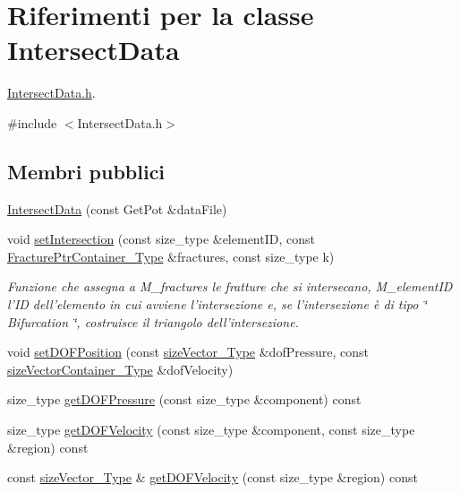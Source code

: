 \hypertarget{classIntersectData}{\section{Riferimenti per la classe Intersect\-Data}
\label{classIntersectData}
}


\hyperlink{IntersectData_8h}{Intersect\-Data.\-h}.  




{\ttfamily \#include $<$Intersect\-Data.\-h$>$}

\subsection*{Membri pubblici}
\begin{DoxyCompactItemize}
\item 
\hyperlink{classIntersectData_a6f368be5c978f120623bdef4b6acab12}{Intersect\-Data} (const Get\-Pot \&data\-File)
\item 
void \hyperlink{classIntersectData_a51a3df0f499c8150c32fe1f12f44ff8d}{set\-Intersection} (const size\-\_\-type \&element\-I\-D, const \hyperlink{FractureHandler_8h_a2f0b57e18ecf89912d7de0c87158009e}{Fracture\-Ptr\-Container\-\_\-\-Type} \&fractures, const size\-\_\-type k)
\begin{DoxyCompactList}\small\item\em Funzione che assegna a M\-\_\-fractures le fratture che si intersecano, M\-\_\-element\-I\-D l'I\-D dell'elemento in cui avviene l'intersezione e, se l'intersezione è di tipo \char`\"{} Bifurcation \char`\"{}, costruisce il triangolo dell'intersezione. \end{DoxyCompactList}\item 
void \hyperlink{classIntersectData_ac4e5826b88471e0f1514cae82c49bcae}{set\-D\-O\-F\-Position} (const \hyperlink{Core_8h_a83c51913d041a5001e8683434c09857f}{size\-Vector\-\_\-\-Type} \&dof\-Pressure, const \hyperlink{Core_8h_a80e8381d86ecb0a7f4f87ff84d1a0be5}{size\-Vector\-Container\-\_\-\-Type} \&dof\-Velocity)
\item 
size\-\_\-type \hyperlink{classIntersectData_a50b33fda9608ffc678057b08e7aed405}{get\-D\-O\-F\-Pressure} (const size\-\_\-type \&component) const 
\item 
size\-\_\-type \hyperlink{classIntersectData_a8a5946e35f80576da495a107464cd2cb}{get\-D\-O\-F\-Velocity} (const size\-\_\-type \&component, const size\-\_\-type \&region) const 
\item 
const \hyperlink{Core_8h_a83c51913d041a5001e8683434c09857f}{size\-Vector\-\_\-\-Type} \& \hyperlink{classIntersectData_ae4cc921b5f9bee74c9a20b25ae7a6f37}{get\-D\-O\-F\-Velocity} (const size\-\_\-type \&region) const 

\end{DoxyCompactItemize}
